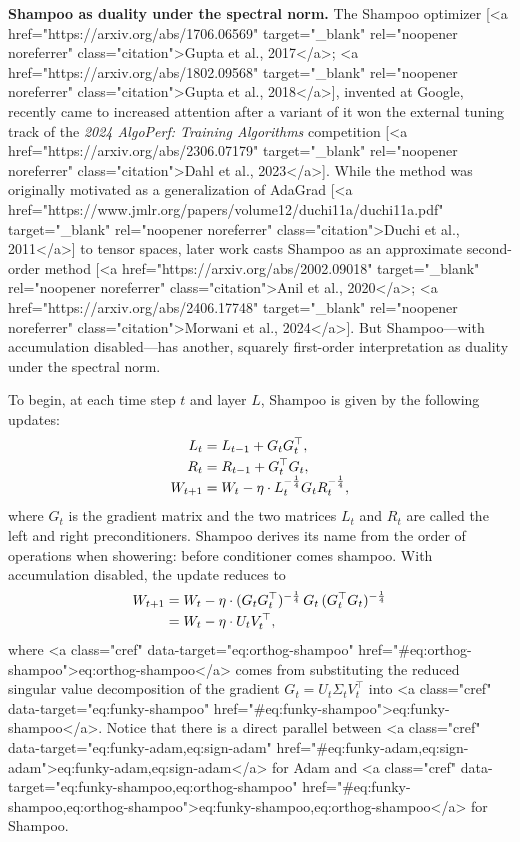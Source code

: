 \textbf{Shampoo as duality under the spectral norm.} The Shampoo optimizer [<a href="https://arxiv.org/abs/1706.06569" target="_blank" rel="noopener noreferrer" class="citation">Gupta et al., 2017</a>; <a href="https://arxiv.org/abs/1802.09568" target="_blank" rel="noopener noreferrer" class="citation">Gupta et al., 2018</a>], invented at Google, recently came to increased attention after a variant of it won the external tuning track of the \textit{2024 AlgoPerf: Training Algorithms} competition [<a href="https://arxiv.org/abs/2306.07179" target="_blank" rel="noopener noreferrer" class="citation">Dahl et al., 2023</a>]. While the method was originally motivated as a generalization of AdaGrad [<a href="https://www.jmlr.org/papers/volume12/duchi11a/duchi11a.pdf" target="_blank" rel="noopener noreferrer" class="citation">Duchi et al., 2011</a>] to tensor spaces, later work casts Shampoo as an approximate second-order method [<a href="https://arxiv.org/abs/2002.09018" target="_blank" rel="noopener noreferrer" class="citation">Anil et al., 2020</a>; <a href="https://arxiv.org/abs/2406.17748" target="_blank" rel="noopener noreferrer" class="citation">Morwani et al., 2024</a>]. But Shampoo---with accumulation disabled---has another, squarely first-order interpretation as duality under the spectral norm.

To begin, at each time step $t$ and layer $L$, Shampoo is given by the following updates:
\begin{align}
    L_t &= L_{t-1} + G_t G_t^\top, \label{eq:L}\\
    R_t &= \smash{R_{t-1} + G_t^\top G_t}, \label{eq:R}\\
    W_{t+1} &= \smash{W_t - \eta \cdot L_t^{-\frac{1}{4}} G_t R_t^{-\frac{1}{4}}},
\end{align}
where $G_t$ is the gradient matrix and the two matrices $L_t$ and $R_t$ are called the left and right preconditioners. Shampoo derives its name from the order of operations when showering: before conditioner comes shampoo. With accumulation disabled, the update reduces to
\begin{align}
    W_{t+1} &= \smash{W_t - \eta \cdot (G_t G_t^\top)^{-\frac{1}{4}} \,G_t\, (G_t^\top G_t)^{-\frac{1}{4}}} \label{eq:funky-shampoo}\\
    &= \smash{W_t - \eta \cdot U_t V_t^\top}, \label{eq:orthog-shampoo}
\end{align}
where <a class="cref" data-target="eq:orthog-shampoo" href="#eq:orthog-shampoo">eq:orthog-shampoo</a> comes from substituting the reduced singular value decomposition of the gradient $G_t = U_t \Sigma_t V_t^\top$ into <a class="cref" data-target="eq:funky-shampoo" href="#eq:funky-shampoo">eq:funky-shampoo</a>. Notice that there is a direct parallel between <a class="cref" data-target="eq:funky-adam,eq:sign-adam" href="#eq:funky-adam,eq:sign-adam">eq:funky-adam,eq:sign-adam</a> for Adam and <a class="cref" data-target="eq:funky-shampoo,eq:orthog-shampoo" href="#eq:funky-shampoo,eq:orthog-shampoo">eq:funky-shampoo,eq:orthog-shampoo</a> for Shampoo.

